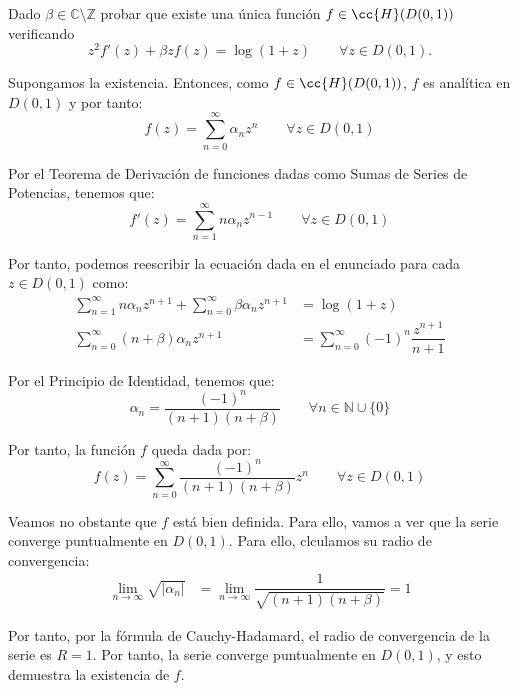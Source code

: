 \documentclass[12pt]{article}
\begin{document}
    \begin{ejercicio}[2.5 puntos] Dado $\beta \in \mathbb{C} \setminus \mathbb{Z}$ probar que existe una única función $f \in \cc{H}(D(0, 1))$ verificando
        $$z^2 f'(z) + \beta z f(z) = \log(1 + z)\qquad \forall z \in D(0, 1).$$

        Supongamos la existencia. Entonces, como $f\in \cc{H}(D(0, 1))$, $f$ es analítica en $D(0, 1)$ y por tanto:
        \begin{equation*}
            f(z) = \sum_{n=0}^{\infty} \alpha_n z^n\qquad \forall z \in D(0, 1)
        \end{equation*}

        Por el Teorema de Derivación de funciones dadas como Sumas de Series de Potencias, tenemos que:
        \begin{equation*}
            f'(z) = \sum_{n=1}^{\infty} n \alpha_n z^{n-1}\qquad \forall z \in D(0, 1)
        \end{equation*}

        Por tanto, podemos reescribir la ecuación dada en el enunciado para cada $z \in D(0, 1)$ como:
        \begin{align*}
            \sum_{n=1}^{\infty} n \alpha_n z^{n+1} + \sum_{n=0}^{\infty} \beta \alpha_n z^{n+1} &= \log(1 + z)\\
            \sum_{n=0}^{\infty} \left(n + \beta\right) \alpha_n z^{n+1} &= \sum_{n=0}^{\infty} (-1)^{n}\dfrac{z^{n+1}}{n+1}
        \end{align*}

        Por el Principio de Identidad, tenemos que:
        \begin{equation*}
            \alpha_n = \frac{(-1)^{n}}{(n+1)(n + \beta)}\qquad \forall n \in \mathbb{N}\cup \{0\}
        \end{equation*}

        Por tanto, la función $f$ queda dada por:
        \begin{equation*}
            f(z) = \sum_{n=0}^{\infty} \frac{(-1)^{n}}{(n+1)(n + \beta)} z^n\qquad \forall z \in D(0, 1)
        \end{equation*}

        Veamos no obstante que $f$ está bien definida. Para ello, vamos a ver que la serie converge puntualmente en $D(0, 1)$. Para ello, clculamos su radio de convergencia:
        \begin{align*}
            \lim_{n \to \infty} \sqrt{|\alpha_n|} &= \lim_{n \to \infty} \dfrac{1}{\sqrt{(n+1)(n + \beta)}} = 1
        \end{align*}

        Por tanto, por la fórmula de Cauchy-Hadamard, el radio de convergencia de la serie es $R = 1$. Por tanto, la serie converge puntualmente en $D(0, 1)$, y esto demuestra la existencia de $f$.
    \end{ejercicio}
\end{document}
